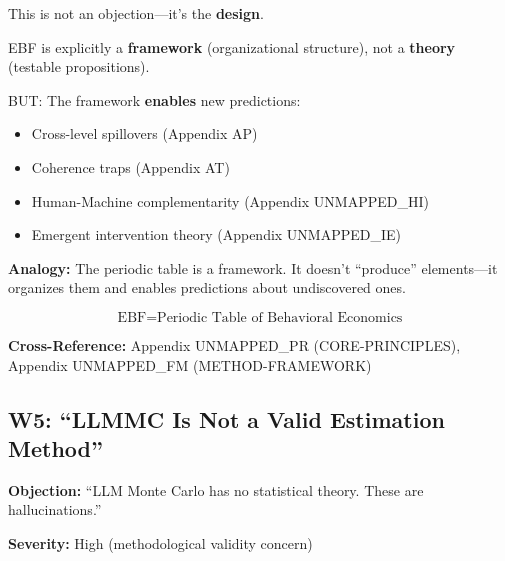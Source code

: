 \begin{axiom}
This is not an objection---it's the \textbf{design}.

EBF is explicitly a \textbf{framework} (organizational structure),
not a \textbf{theory} (testable propositions).

BUT: The framework \textbf{enables} new predictions:
\begin{itemize}[nosep]
    \item Cross-level spillovers (Appendix AP)
    \item Coherence traps (Appendix AT)
    \item Human-Machine complementarity (Appendix UNMAPPED_HI)
    \item Emergent intervention theory (Appendix UNMAPPED_IE)
\end{itemize}

\textbf{Analogy:} The periodic table is a framework. It doesn't ``produce''
elements---it organizes them and enables predictions about undiscovered ones.

\begin{equation}
\text{EBF} = \text{Periodic Table of Behavioral Economics}
\end{equation}
\end{axiom}

\textbf{Cross-Reference:} Appendix UNMAPPED_PR (CORE-PRINCIPLES), Appendix UNMAPPED_FM (METHOD-FRAMEWORK)

\subsection{W5: ``LLMMC Is Not a Valid Estimation Method''}
\label{sec:da-w5}

\begin{tcolorbox}[colback=gray!5!white, colframe=gray!75!black]
\textbf{Objection:} ``LLM Monte Carlo has no statistical theory. These are hallucinations.''

\textbf{Severity:} High (methodological validity concern)
\end{tcolorbox}

